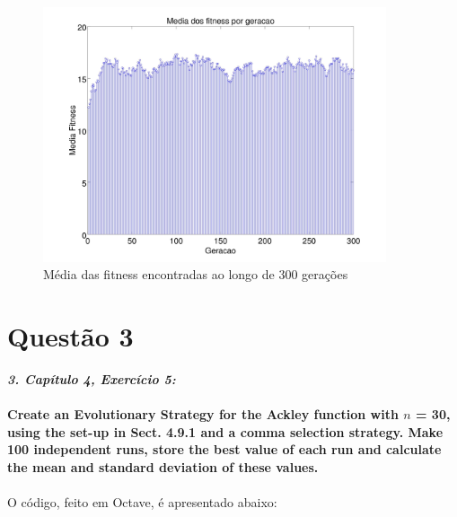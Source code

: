 \documentclass{report}
\begin{document}
	\begin{figure}[H]
		\centering
		\includegraphics[width = 0.9\textwidth]{Q02_media_fitness_300.jpg}
		\caption{Média das fitness encontradas ao longo de 300 gerações}
		\label{media_fitness_300_q02}
	\end{figure}
	
	\section*{Questão 3}
	
	\textbf{\textit{3. Capítulo 4, Exercício 5:}}\\\\
	
	\textbf{Create an Evolutionary Strategy for the Ackley function with $n$ = 30, using the set-up in Sect. 4.9.1 and a comma selection strategy. Make 100 independent runs, store the best value of each run and calculate the mean and standard deviation of these values.}
	
	\paragraph{} O código, feito em Octave, é apresentado abaixo:\\
	
\end{document}
